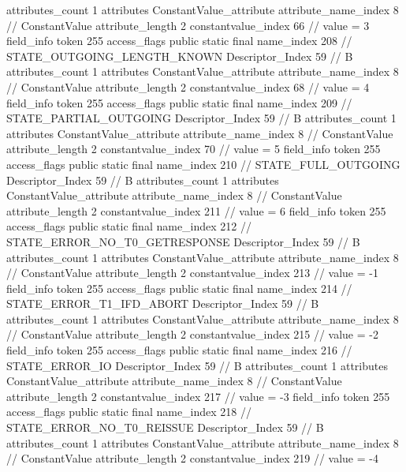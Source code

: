 {{{{{				attributes_count	1
				attributes {
				ConstantValue_attribute {
					attribute_name_index	8		// ConstantValue
					attribute_length	2
					constantvalue_index	66		// value = 3
				}
				}
			}
			field_info {
				token	255
				access_flags	public static final
				name_index	208		// STATE_OUTGOING_LENGTH_KNOWN
				Descriptor_Index	59		// B
				attributes_count	1
				attributes {
				ConstantValue_attribute {
					attribute_name_index	8		// ConstantValue
					attribute_length	2
					constantvalue_index	68		// value = 4
				}
				}
			}
			field_info {
				token	255
				access_flags	public static final
				name_index	209		// STATE_PARTIAL_OUTGOING
				Descriptor_Index	59		// B
				attributes_count	1
				attributes {
				ConstantValue_attribute {
					attribute_name_index	8		// ConstantValue
					attribute_length	2
					constantvalue_index	70		// value = 5
				}
				}
			}
			field_info {
				token	255
				access_flags	public static final
				name_index	210		// STATE_FULL_OUTGOING
				Descriptor_Index	59		// B
				attributes_count	1
				attributes {
				ConstantValue_attribute {
					attribute_name_index	8		// ConstantValue
					attribute_length	2
					constantvalue_index	211		// value = 6
				}
				}
			}
			field_info {
				token	255
				access_flags	public static final
				name_index	212		// STATE_ERROR_NO_T0_GETRESPONSE
				Descriptor_Index	59		// B
				attributes_count	1
				attributes {
				ConstantValue_attribute {
					attribute_name_index	8		// ConstantValue
					attribute_length	2
					constantvalue_index	213		// value = -1
				}
				}
			}
			field_info {
				token	255
				access_flags	public static final
				name_index	214		// STATE_ERROR_T1_IFD_ABORT
				Descriptor_Index	59		// B
				attributes_count	1
				attributes {
				ConstantValue_attribute {
					attribute_name_index	8		// ConstantValue
					attribute_length	2
					constantvalue_index	215		// value = -2
				}
				}
			}
			field_info {
				token	255
				access_flags	public static final
				name_index	216		// STATE_ERROR_IO
				Descriptor_Index	59		// B
				attributes_count	1
				attributes {
				ConstantValue_attribute {
					attribute_name_index	8		// ConstantValue
					attribute_length	2
					constantvalue_index	217		// value = -3
				}
				}
			}
			field_info {
				token	255
				access_flags	public static final
				name_index	218		// STATE_ERROR_NO_T0_REISSUE
				Descriptor_Index	59		// B
				attributes_count	1
				attributes {
				ConstantValue_attribute {
					attribute_name_index	8		// ConstantValue
					attribute_length	2
					constantvalue_index	219		// value = -4
				}
				}
}}}}}
